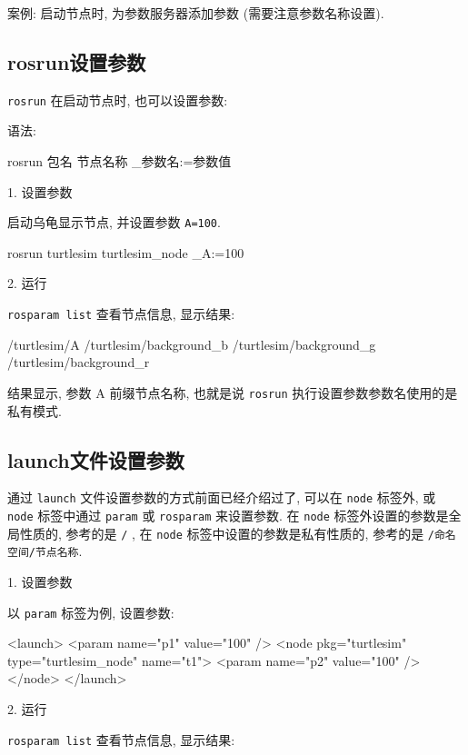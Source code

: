 \documentclass[openany, fontset=windowsold]{ctexbook}
\theoremstyle{kaiti}
\theoremstyle{normal}
\begin{document}
案例: 启动节点时, 为参数服务器添加参数 (需要注意参数名称设置).

\subsection{rosrun设置参数}

\verb|rosrun| 在启动节点时, 也可以设置参数:

语法: 

\begin{bash}
  rosrun 包名 节点名称 _参数名:=参数值
\end{bash}

1. 设置参数

启动乌龟显示节点, 并设置参数 \verb|A=100|.

\begin{bash}
  rosrun turtlesim turtlesim_node _A:=100
\end{bash}

2. 运行

\verb|rosparam list| 查看节点信息, 显示结果:

\begin{bash}
  /turtlesim/A
  /turtlesim/background_b
  /turtlesim/background_g
  /turtlesim/background_r
\end{bash}

结果显示, 参数 A 前缀节点名称, 也就是说 \verb|rosrun| 执行设置参数参数名使用的是私有模式.

\subsection{launch文件设置参数}

通过 \verb|launch| 文件设置参数的方式前面已经介绍过了, 可以在 \verb|node| 标签外, 或 \verb|node| 标签中通过 \verb|param| 或 \verb|rosparam| 来设置参数. 在 \verb|node| 标签外设置的参数是全局性质的, 参考的是 \verb|/| , 在 \verb|node| 标签中设置的参数是私有性质的, 参考的是 \verb|/命名空间/节点名称|.

1. 设置参数

以 \verb|param| 标签为例, 设置参数:

\begin{xml}
  <launch>
      <param name="p1" value="100" />
      <node pkg="turtlesim" type="turtlesim_node" name="t1">
          <param name="p2" value="100" />
      </node>
  </launch>
\end{xml}

2. 运行

\verb|rosparam list| 查看节点信息, 显示结果:
\end{document}
